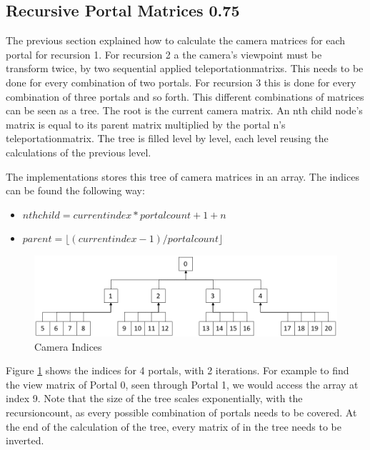 \subsection{Recursive Portal Matrices 0.75}
\label{section:recursivecameramatrices}
The previous section explained how to calculate the camera matrices for each portal for recursion 1. For recursion 2 a the camera's viewpoint must be transform twice, by two sequential applied \glspl{teleportationmatrix}. This needs to be done for every combination of two portals. For recursion 3 this is done for every combination of three portals and so forth. This different combinations of matrices can be seen as a tree. The root is the current camera matrix. An nth child node's matrix is equal to its parent matrix multiplied by the portal n's \gls{teleportationmatrix}. The tree is filled level by level, each level reusing the calculations of the previous level.




The implementations stores this tree of camera matrices in an array. The indices can be found the following way:

\begin{itemize}
	\item $ nth child = current index * portalcount + 1 + n$
	\item $ parent = \lfloor(current index-1)/portal count\rfloor $
\end{itemize}




\begin{figure}[h]
	\includegraphics[width=\linewidth]{images/cameraindices.png}
	\caption{Camera Indices}
	\label{fig:cameraindices}
\end{figure}

Figure \ref{fig:cameraindices} shows the indices for 4 portals, with 2 iterations. For example to find the view matrix of Portal 0, seen through Portal 1, we would access the array at index 9. Note that the size of the tree scales exponentially, with the \gls{recursioncount}, as every possible combination of portals needs to be covered. At the end of the calculation of the tree, every matrix of in the tree needs to be inverted.


